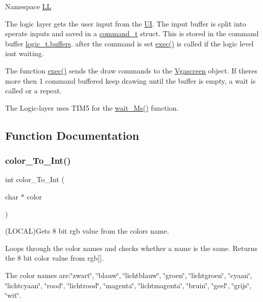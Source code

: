 Namespace \mbox{\hyperlink{namespace_l_l}{LL}}

The logic layer get\textquotesingle{}s the user input from the \mbox{\hyperlink{namespace_u_i}{UI}}. The input buffer is split into sperate inputs and saved in a \mbox{\hyperlink{struct_l_l_1_1command__t}{command\+\_\+t}} struct. This is stored in the command buffer \mbox{\hyperlink{struct_l_l_1_1logic__t_a09663354d4cddc7fc94fce6d60c2a9a2}{logic\+\_\+t.\+buffers}}. after the command is set \mbox{\hyperlink{namespace_l_l_ac98bc19f4e3468b76cfc2e43456527cc}{exec()}} is called if the logic level isn\textquotesingle{}t waiting.

The function \mbox{\hyperlink{namespace_l_l_ac98bc19f4e3468b76cfc2e43456527cc}{exec()}} sends the draw commands to the \mbox{\hyperlink{class_vgascreen}{Vgascreen}} object. If there\textquotesingle{}s more then 1 command buffered keep drawing until the buffer is empty, a wait is called or a repeat.

The Logic-\/layer uses T\+I\+M5 for the \mbox{\hyperlink{namespace_l_l_ab30bdedb41438098df71bea7d5eb624d}{wait\+\_\+\+Ms()}} function. 

\subsection{Function Documentation}
\mbox{\label{namespace_l_l_af61e12d8feebbbdb330c2405c305840b}} 
\subsubsection{\texorpdfstring{color\+\_\+\+To\+\_\+\+Int()}{color\_To\_Int()}}
{\footnotesize\ttfamily int color\+\_\+\+To\+\_\+\+Int (\begin{DoxyParamCaption}\item[{char $\ast$}]{color }\end{DoxyParamCaption})}



(L\+O\+C\+AL)Gets 8 bit rgb value from the colors name. 

Loops through the color names and checks whether a name is the same. Returns the 8 bit color value from rgb\mbox{[}\mbox{]}.

The color names are\+:\char`\"{}zwart\char`\"{}, \char`\"{}blauw\char`\"{}, \char`\"{}lichtblauw\char`\"{}, \char`\"{}groen\char`\"{}, \char`\"{}lichtgroen\char`\"{}, \char`\"{}cyaan\char`\"{}, \char`\"{}lichtcyaan\char`\"{}, \char`\"{}rood\char`\"{}, \char`\"{}lichtrood\char`\"{}, \char`\"{}magenta\char`\"{}, \char`\"{}lichtmagenta\char`\"{}, \char`\"{}bruin\char`\"{}, \char`\"{}geel\char`\"{}, \char`\"{}grijs\char`\"{}, \char`\"{}wit\char`\"{}.


